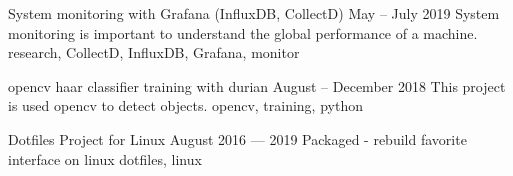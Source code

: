 
\begin{projects}

	\project%
		{System monitoring with Grafana (InfluxDB, CollectD)}
		{May -- July 2019}
		{}
		{System monitoring is important to understand the global performance of a machine.}
		{research, CollectD, InfluxDB, Grafana, monitor }

	\project%
		{opencv haar classifier training with durian}
		{August -- December 2018}
		{}
		{This project is used opencv to detect objects.}
		{opencv, training, python}
		
	\project%
		{Dotfiles Project for Linux}
		{August 2016 --- 2019}
		{}
		{Packaged - rebuild favorite interface on linux}
		{dotfiles, linux}
		
\end{projects}